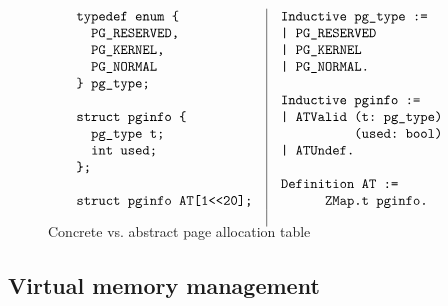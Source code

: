 {\begin{figure}[ht]\scriptsize
$$
\begin{array}{l|l}
\begin{array}{l}
\verb"typedef enum {"\\
\verb"  PG_RESERVED,"\\
\verb"  PG_KERNEL,"\\
\verb"  PG_NORMAL"\\
\verb"} pg_type;"\\
\\
\verb"struct pginfo {"\\
\verb"  pg_type	t;"\\
\verb"  int	used;"\\
\verb"};"\\
\\
\verb"struct pginfo AT[1<<20];"
\end{array}
&
\begin{array}{l}
\verb+Inductive pg_type :=+\\
\verb+| PG_RESERVED+\\  
\verb+| PG_KERNEL+\\  
\verb+| PG_NORMAL.+\\
\\
\verb+Inductive pginfo :=+\\
\verb+| ATValid (t: pg_type)+\\
\verb+          (used: bool)+\\ 
\verb+| ATUndef.+\\
\\
\verb+Definition AT :=+\\
\verb+      ZMap.t pginfo.+\\
\end{array}
\\\vspace*{-14pt}
\end{array}
$$ 
\caption{Concrete vs. abstract page allocation table}
\label{fig:abs:atable}
\vspace*{-14pt}
\end{figure}

}


\subsection{Virtual memory management}
\label{sec:base:vmm} 

